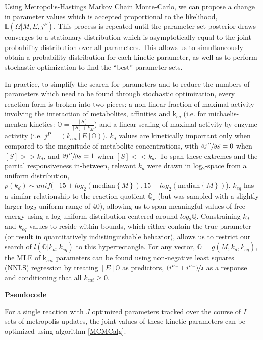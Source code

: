 \documentclass[12pt]{nature}\usepackage{graphicx, color}
\begin{document}
Using Metropolis-Hastings Markov Chain Monte-Carlo, we can propose a change in parameter values which is accepted proportional to the likelihood, $\mathbb{L}(\Omega | M, E, j^{P})$.  This process is repeated until the parameter set posterior draws converges to a stationary distribution which is asymptotically equal to the joint probability distribution over all parameters.  This allows us to simultaneously obtain a probability distribution for each kinetic parameter, as well as to perform stochastic optimization to find the ``best'' parameter sets.

In practice, to simplify the search for parameters and to reduce the numbers of parameters which need to be found through stochastic optimization, every reaction form is broken into two pieces: a non-linear fraction of maximal activity involving the interaction of metabolites, affinities and k$_{eq}$ (i.e. for michaelis-menten kinetics: $\mathbb{O} = \frac{[S]}{[S] + k_{M}}$) and a linear scaling of maximal activity by enzyme activity (i.e. $j^{P} = (k_{cat}[E]\mathbb{O})$).  $k_{d}$ values are kinetically important only when compared to the magnitude of metabolite concentrations, with $\sfrac{\partial j^{P}}{\partial S} = 0$ when $[S] >> k_{d}$, and $\sfrac{\partial j^{P}}{\partial S} = 1$ when $[S] << k_{d}$.  To span these extremes and the partial responsiveness in-between, relevant $k_{d}$ were drawn in log$_{2}$-space from a uniform distribution, $p(k_{d}) \sim unif(-15 + log_{2}(\text{median}\left\{M\right\}), 15 + log_{2}(\text{median}\left\{M\right\})$).  $k_{eq}$ has a similar relationship to the reaction quotient $\mathbb{Q}_{r}$ (but was sampled with a slightly larger log$_{2}$-uniform range of 40), allowing us to span meaningful values of free energy using a log-uniform distribution centered around $log_{2}\mathbb{Q}$.  Constraining $k_{d}$ and $k_{eq}$ values to reside within bounds, which either contain the true parameter (or result in quantitatively indistinguishable behavior), allows us to restrict our search of $l(\mathbb{O}|k_{d}, k_{eq})$ to this hyperrectangle.  For any vector, $\mathbb{O} = g(M, k_{d}, k_{eq})$, the MLE of k$_{cat}$ parameters can be found using non-negative least squares (NNLS) regression by treating $[E]\mathbb{O}$ as predictors, $\sfrac{(j^{F-} + j^{F+})}{2}$ as a response and conditioning that all $k_{cat} \ge 0$.

\textbf{Pseudocode}

For a single reaction with \textit{J} optimized parameters tracked over the course of \textit{I} sets of metropolis updates, the joint values of these kinetic parameters can be optimized using algorithm \ref{MCMCalg}.
\end{document}
